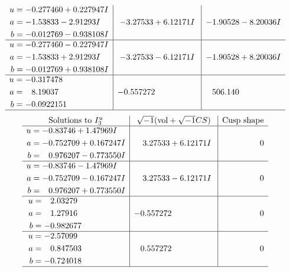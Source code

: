 \documentclass[1p]{elsarticle_modified}
\theoremstyle{definition}
\newcommand{\I}{\sqrt{-1}}
\begin{document}
$$\begin{array}{c|c|c}
\begin{aligned}
u &= -0.277460 + 0.227947 I \\
a &= -1.53833 - 2.91293 I \\
b &= -0.012769 - 0.938108 I\end{aligned}
 & -3.27533 + 6.12171 I & -1.90528 - 8.20036 I \\ \hline\begin{aligned}
u &= -0.277460 - 0.227947 I \\
a &= -1.53833 + 2.91293 I \\
b &= -0.012769 + 0.938108 I\end{aligned}
 & -3.27533 - 6.12171 I & -1.90528 + 8.20036 I \\ \hline\begin{aligned}
u &= -0.317478\phantom{ +0.000000I} \\
a &= \phantom{-}8.19037\phantom{ +0.000000I} \\
b &= -0.0922151\phantom{ +0.000000I}\end{aligned}
 & -0.557272\phantom{ +0.000000I} & \phantom{-}506.140\phantom{ +0.000000I}\\
 \hline 
 \end{array}$$\newpage$$\begin{array}{c|c|c}  
\text{Solutions to }I^u_{3}& \I (\text{vol} + \sqrt{-1}CS) & \text{Cusp shape}\\
 \hline 
\begin{aligned}
u &= -0.83746 + 1.47969 I \\
a &= -0.752709 + 0.167247 I \\
b &= \phantom{-}0.976207 - 0.773550 I\end{aligned}
 & \phantom{-}3.27533 + 6.12171 I & \phantom{-0.000000 } 0 \\ \hline\begin{aligned}
u &= -0.83746 - 1.47969 I \\
a &= -0.752709 - 0.167247 I \\
b &= \phantom{-}0.976207 + 0.773550 I\end{aligned}
 & \phantom{-}3.27533 - 6.12171 I & \phantom{-0.000000 } 0 \\ \hline\begin{aligned}
u &= \phantom{-}2.03279\phantom{ +0.000000I} \\
a &= \phantom{-}1.27916\phantom{ +0.000000I} \\
b &= -0.982677\phantom{ +0.000000I}\end{aligned}
 & -0.557272\phantom{ +0.000000I} & \phantom{-0.000000 } 0 \\ \hline\begin{aligned}
u &= -2.57099\phantom{ +0.000000I} \\
a &= \phantom{-}0.847503\phantom{ +0.000000I} \\
b &= -0.724018\phantom{ +0.000000I}\end{aligned}
 & \phantom{-}0.557272\phantom{ +0.000000I} & \phantom{-0.000000 } 0\\
 \hline 
 \end{array}$$\newpage\newpage\renewcommand{\arraystretch}{1}
\end{document}
